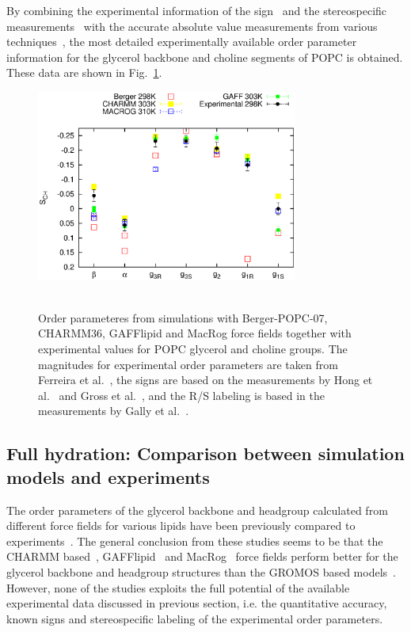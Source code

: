 \documentclass[pre,aps,floatfix,authordate1-4,twocolumn]{revtex4-1}
\begin{document}
By combining the experimental information of the sign~\cite{hong95a,hong95b,gross97} and the stereospecific
measurements~\cite{gally81} with the accurate absolute value measurements from various techniques~\cite{gally75,akutsu81,gross97,dvinskikh05a,ferreira13},
the most detailed experimentally available order parameter information for the glycerol backbone and choline segments of POPC is obtained.
These data are shown in Fig.~\ref{HGorderparameters2}.
\begin{figure}[]
  \centering
  \includegraphics[width=8.6cm]{HGorderparameters5.eps} \\
   \\
  \caption{\label{HGorderparameters2}
  Order parameteres from simulations with Berger-POPC-07, CHARMM36, GAFFlipid and MacRog force fields together with experimental values for POPC glycerol and choline groups.
  The magnitudes for experimental order parameters are taken from Ferreira et al.~\cite{ferreira13}, the signs are based on the measurements by Hong et al.~\cite{hong95a,hong95b} 
  and Gross et al.~\cite{gross97}, and the R/S labeling is based in the measurements by Gally et al.~\cite{gally81}.
} 
\end{figure}

\subsection{Full hydration: Comparison between simulation models and experiments}

The order parameters of the glycerol backbone and headgroup calculated from different force fields for various lipids have been 
previously compared to experiments~\cite{shinoda97,hogberg08,castro08,klauda10,kapla12,dickson12,poger12,ferreira13,chowdhary13,maciejewski14}. 
The general conclusion from these studies seems to be that the CHARMM based~\cite{hogberg08,klauda10}, GAFFlipid~\cite{dickson12} and
MacRog~\cite{maciejewski14} force fields perform better for the glycerol backbone and headgroup structures than the GROMOS based models~\cite{castro08,kapla12,poger12,ferreira13}.
However, none of the studies exploits the full potential of the available experimental data discussed in previous section, i.e. the quantitative accuracy, known signs and stereospecific labeling of
the experimental order parameters.
\end{document}
